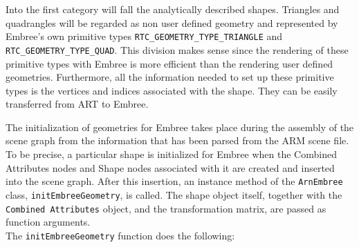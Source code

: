 Into the first category will fall the analytically described shapes. Triangles and quadrangles will be regarded as non user defined geometry and represented by Embree's own primitive types \texttt{RTC\_GEOMETRY\_TYPE\_TRIANGLE} and \texttt{RTC\_GEOMETRY\_TYPE\_QUAD}. This division makes sense since the rendering of these primitive types with Embree is more efficient than the rendering user defined geometries. Furthermore, all the information needed to set up these primitive types is the vertices and indices associated with the shape. They can be easily transferred from ART to Embree. 


The initialization of geometries for Embree takes place during the assembly of the scene graph from the information that has been parsed from the ARM scene file. To be precise, a particular shape is initialized for Embree when the Combined Attributes nodes and Shape nodes associated with it are created and inserted into the scene graph. After this insertion, an instance method of the \texttt{ArnEmbree} class, \texttt{initEmbreeGeometry}, is called. The shape object itself, together with the \texttt{Combined Attributes} object, and the transformation matrix, are passed as function arguments. 
\\

The \texttt{initEmbreeGeometry} function does the following:

